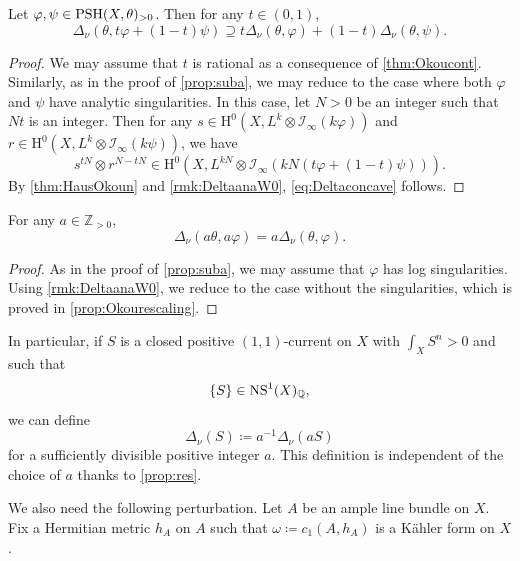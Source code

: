 \begin{theorem}\label{thm:concOko}
	Let $\varphi,\psi\in \mathrm{PSH}(X,\theta)_{>0}$. Then for any $t\in (0,1)$,
	\begin{equation}\label{eq:Deltaconcave}
		\Delta_{\nu}\left(\theta,t\varphi+(1-t)\psi\right)\supseteq t\Delta_{\nu}(\theta,\varphi)+(1-t)\Delta_{\nu}(\theta,\psi).
	\end{equation}
\end{theorem}
\begin{proof}
		We may assume that $t$ is rational as a consequence of \cref{thm:Okoucont}. Similarly, as in the proof of \cref{prop:suba},
		we may reduce to the case where both $\varphi$ and $\psi$ have analytic singularities.
	In this case, let $N>0$ be an integer such that $Nt$ is an integer.
    Then for any $s\in \mathrm{H}^0(X,L^k\otimes \mathcal{I}_{\infty}(k\varphi))$ and $r\in \mathrm{H}^0(X,L^k\otimes \mathcal{I}_{\infty}(k\psi))$, we have
    \[
    s^{tN}\otimes r^{N-tN}\in \mathrm{H}^0\left(X,L^{kN}\otimes \mathcal{I}_{\infty}\left(kN(t\varphi+(1-t)\psi)\right)\right).
    \]
	By \cref{thm:HausOkoun} and \cref{rmk:DeltaanaW0}, \eqref{eq:Deltaconcave} follows.
\end{proof}

\begin{proposition}\label{prop:res}
	For any $a\in \mathbb{Z}_{>0}$,
	\[
		\Delta_{\nu}(a\theta,a\varphi)=a\Delta_{\nu}(\theta,\varphi).
	\]
\end{proposition}
\begin{proof}
As in the proof of \cref{prop:suba}, we may assume that $\varphi$ has log singularities. Using \cref{rmk:DeltaanaW0}, we reduce to the case without the singularities, which is proved in
\cref{prop:Okourescaling}.
\end{proof}

In particular, if $S$ is a closed positive $(1,1)$-current on $X$ with $\int_X S^n>0$ and such that
\[
\{S\}\in \mathrm{NS}^1(X)_{\mathbb{Q}},
\]
we can define
\begin{equation}\label{eq:DeltanuTalgebraic1}
\Delta_{\nu}(S)\coloneqq a^{-1}\Delta_{\nu}(aS)
\end{equation}
for a sufficiently divisible positive integer $a$. This definition is independent of the choice of $a$ thanks to \cref{prop:res}.

We also need the following perturbation. Let $A$ be an ample line bundle on $X$. Fix a Hermitian metric $h_A$ on $A$ such that $\omega\coloneqq c_1(A,h_A)$ is a Kähler form on $X$.

